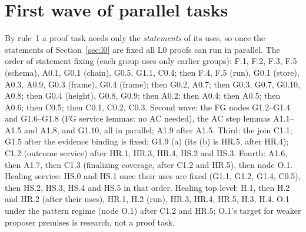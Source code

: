 \documentclass{article}
\begin{document}
\section{First wave of parallel tasks}\label{sec:wave}

By rule~1 a proof task needs only the \emph{statements} of its uses, so once
the statements of Section~\ref{sec:l0} are fixed all L0 proofs can run in
parallel.  The order of statement fixing (each group uses only earlier
groups): F.1, F.2, F.3, F.5 (schema), A0.1, G0.1 (chain), G0.5, G1.1, C0.4; then F.4, F.5 (run), G0.1 (store), A0.3,
A0.9, G0.3 (frame), G0.4 (frame); then G0.2, A0.7; then G0.3, G0.7, G0.10, A0.8;
then G0.4 (height), G0.8, G0.9; then A0.2; then A0.4; then A0.5; then
A0.6; then C0.5; then C0.1, C0.2, C0.3.  Second wave: the FG nodes
G1.2--G1.4 and G1.6--G1.8 (FG service lemmas: no AC needed), the AC step
lemmas A1.1--A1.5 and A1.8, and G1.10, all in parallel; A1.9 after
A1.5.  Third: the join C1.1; G1.5 after the evidence
binding is fixed; G1.9 (a) (its (b) is HR.5, after HR.4); C1.2 (outcome service) after HR.1,
HR.3, HR.4, HS.2 and HS.3.
Fourth: A1.6, then A1.7, then C1.3 (finalizing coverage, after C1.2 and HR.5), then
node O.1.  Healing service: HS.0 and HS.1 once their uses
are fixed (G1.1, G1.2, G1.4, C0.5), then HS.2, HS.3, HS.4 and HS.5 in that
order.  Healing top level: H.1, then H.2 and HR.2 (after their uses), HR.1,
H.2 (run), HR.3, HR.4, HR.5, H.3, H.4.
O.1 under the pattern regime (node O.1) after C1.2 and HR.5; O.1's target
for weaker proposer premises is research, not a proof task.
\end{document}
